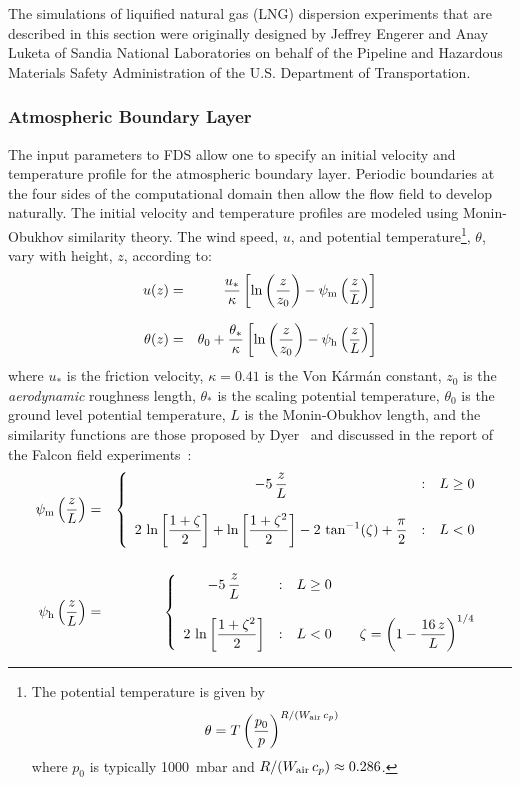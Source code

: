 The simulations of liquified natural gas (LNG) dispersion experiments that are described in this section were originally designed by Jeffrey Engerer and Anay Luketa of Sandia National Laboratories on behalf of the Pipeline and Hazardous Materials Safety Administration of the U.S. Department of Transportation.

\subsubsection{Atmospheric Boundary Layer}

The input parameters to FDS allow one to specify an initial velocity and temperature profile for the atmospheric boundary layer. Periodic boundaries at the four sides of the computational domain then allow the flow field to develop naturally. The initial velocity and temperature profiles are modeled using Monin-Obukhov similarity theory. The wind speed, $u$, and potential temperature\footnote{The potential temperature is given by $$\theta=T \left( \frac{p_0}{p} \right)^{R/(W_{\rm air} \, c_p)}$$ where $p_0$ is typically 1000~mbar and $R/(W_{\rm air} \, c_p) \approx 0.286$.}, $\theta$, vary with height, $z$, according to:
\begin{eqnarray}
   u(z)      &=&            \frac{u_*}{\kappa}     \left[ \ln \left( \frac{z}{z_0} \right) - \psi_{\rm m} \left( \frac{z}{L} \right) \right] \label{u_om} \\[.1in]
   \theta(z) &=& \theta_0 + \frac{\theta_*}{\kappa} \left[ \ln \left( \frac{z}{z_0} \right) - \psi_{\rm h} \left( \frac{z}{L} \right) \right]
\end{eqnarray}
where $u_*$ is the friction velocity, $\kappa=0.41$ is the Von K\'{a}rm\'{a}n constant, $z_0$ is the \emph{aerodynamic} roughness length, $\theta_*$ is the scaling potential temperature, $\theta_0$ is the ground level potential temperature, $L$ is the Monin-Obukhov length, and the similarity functions are those proposed by Dyer~\cite{Dyer:1974} and discussed in the report of the Falcon field experiments~\cite{Falcon}:
\begin{eqnarray}
   \psi_{\rm m}\left(\frac{z}{L}\right) &=& \left\{ \begin{array}{c@{\quad:\quad}l} \displaystyle -5 \, \frac{z}{L} & L \ge 0 \\[.2in]  \displaystyle 2 \, \ln \left[\frac{1+\zeta}{2}\right] + \ln \left[\frac{1+\zeta^2}{2}\right]-2 \, \tan^{-1}(\zeta) + \frac{\pi}{2} & L<0 \end{array} \right.  \\[.2in]
   \psi_{\rm h}\left(\frac{z}{L}\right) &=& \left\{ \begin{array}{c@{\quad:\quad}l} \displaystyle -5 \, \frac{z}{L} & L \ge 0 \\[.2in]  \displaystyle 2 \, \ln \left[\frac{1+\zeta^2}{2}\right] & L<0 \quad \quad  \displaystyle \zeta=\left( 1 - \frac{16 \, z}{L} \right)^{1/4}  \end{array} \right.
\end{eqnarray}
